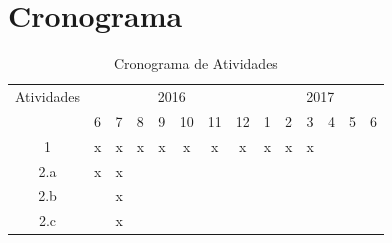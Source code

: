 \chapter{Cronograma}
\label{chapter:cronograma}
\begin{table}[ht!]
\centering
\caption{Cronograma de Atividades}
\label{my-label}
\begin{tabular}{|c|l|l|l|l|l|l|l|l|l|l|l|l|l|}
\hline
\multicolumn{1}{|l|}{Atividades} & \multicolumn{7}{c|}{2016}                                                                                                                                                    & \multicolumn{6}{c|}{2017}                                                            \\ \cline{2-14} 
\multicolumn{1}{|l|}{}                            & 6                      & 7                      & 8                      & 9                      & 10                     & 11                     & 12                     & 1                      & 2                      & 3                      & 4 & 5 & 6 \\ \hline
1                                                 & \multicolumn{1}{c|}{x} & \multicolumn{1}{c|}{x} & \multicolumn{1}{c|}{x} & \multicolumn{1}{c|}{x} & \multicolumn{1}{c|}{x} & \multicolumn{1}{c|}{x} & \multicolumn{1}{c|}{x} & \multicolumn{1}{c|}{x} & \multicolumn{1}{c|}{x} & \multicolumn{1}{c|}{x} &   &   &   \\ \hline
2.a                                               & x                      & x                      &                        &                        &                        &                        &                        &                        &                        &                        &   &   &   \\ \hline
2.b                                               &                        & x                      &                        &                        &                        &                        &                        &                        &                        &                        &   &   &   \\ \hline
2.c                                               &                        & x                      &                        &                        &                        &                        &                        &                        &                        &                        &   &   &   \\ \hline

\end{tabular}
\end{table}

